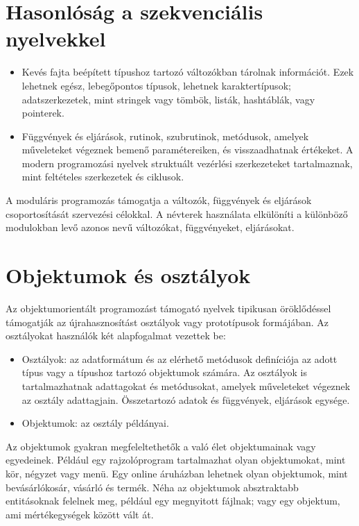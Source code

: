 \documentclass[]{thesis-ekf}
\theoremstyle{definition}
\begin{document}
	\section{Hasonlóság a szekvenciális nyelvekkel}
	
	\begin{itemize}
		\item Kevés fajta beépített típushoz tartozó változókban tárolnak információt. Ezek lehetnek egész, lebegőpontos típusok, lehetnek karaktertípusok; adatszerkezetek, mint stringek vagy tömbök, listák, hashtáblák, vagy pointerek.
		\item Függvények és eljárások, rutinok, szubrutinok, metódusok, amelyek műveleteket végeznek bemenő paramétereiken, és visszaadhatnak értékeket. A modern programozási nyelvek struktuált vezérlési szerkezeteket tartalmaznak, mint feltételes szerkezetek és ciklusok.
	\end{itemize}
	
	A moduláris programozás támogatja a változók, függvények és eljárások csoportosítását szervezési célokkal. A névterek használata elkülöníti a különböző modulokban levő azonos nevű változókat, függvényeket, eljárásokat.
	
	\section{Objektumok és osztályok}
	Az objektumorientált programozást támogató nyelvek tipikusan öröklődéssel támogatják az újrahasznosítást osztályok vagy prototípusok formájában. Az osztályokat használók két alapfogalmat vezettek be:
	
	\begin{itemize}
		\item Osztályok: az adatformátum és az elérhető metódusok definíciója az adott típus vagy a típushoz tartozó objektumok számára. Az osztályok is tartalmazhatnak adattagokat és metódusokat, amelyek műveleteket végeznek az osztály adattagjain. Összetartozó adatok és függvények, eljárások egysége.
		\item Objektumok: az osztály példányai.
	\end{itemize}
	
	Az objektumok gyakran megfeleltethetők a való élet objektumainak vagy egyedeinek. Például egy rajzolóprogram tartalmazhat olyan objektumokat, mint kör, négyzet vagy menü. Egy online áruházban lehetnek olyan objektumok, mint bevásárlókosár, vásárló és termék. Néha az objektumok absztraktabb entitásoknak felelnek meg, például egy megnyitott fájlnak; vagy egy objektum, ami mértékegységek között vált át.
	
\end{document}
